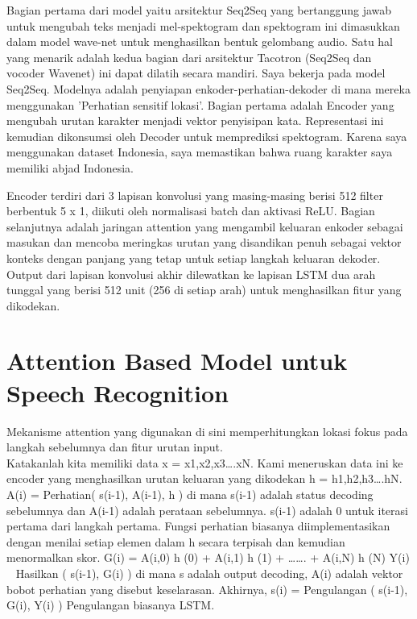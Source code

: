 Bagian pertama dari model yaitu arsitektur Seq2Seq yang bertanggung jawab untuk mengubah teks menjadi mel-spektogram dan spektogram ini dimasukkan dalam model wave-net untuk menghasilkan bentuk gelombang audio. Satu hal yang menarik adalah kedua bagian dari arsitektur Tacotron (Seq2Seq dan vocoder Wavenet) ini dapat dilatih secara mandiri. Saya bekerja pada model Seq2Seq.
Modelnya adalah penyiapan enkoder-perhatian-dekoder di mana mereka menggunakan 'Perhatian sensitif lokasi'. Bagian pertama adalah Encoder yang mengubah urutan karakter menjadi vektor penyisipan kata. Representasi ini kemudian dikonsumsi oleh Decoder untuk memprediksi spektogram. Karena saya menggunakan dataset Indonesia, saya memastikan bahwa ruang karakter saya memiliki abjad Indonesia.

Encoder terdiri dari 3 lapisan konvolusi yang masing-masing berisi 512 filter berbentuk 5 x 1, diikuti oleh normalisasi batch dan aktivasi ReLU. Bagian selanjutnya adalah jaringan attention yang mengambil keluaran enkoder sebagai masukan dan mencoba meringkas urutan yang disandikan penuh sebagai vektor konteks dengan panjang yang tetap untuk setiap langkah keluaran dekoder.
Output dari lapisan konvolusi akhir dilewatkan ke lapisan LSTM dua arah tunggal yang berisi 512 unit (256 di setiap arah) untuk menghasilkan fitur yang dikodekan\cite{9414001}.

\section{Attention Based Model untuk Speech Recognition}
Mekanisme attention yang digunakan di sini memperhitungkan lokasi fokus pada langkah sebelumnya dan fitur urutan input.\\
Katakanlah kita memiliki data x = {x1,x2,x3….xN}. Kami meneruskan data ini ke encoder yang menghasilkan urutan keluaran yang dikodekan h = {h1,h2,h3….hN}.
A(i) = Perhatian( s(i-1), A(i-1), h ) di mana s(i-1) adalah status decoding sebelumnya dan A(i-1) adalah perataan sebelumnya.
s(i-1) adalah 0 untuk iterasi pertama dari langkah pertama.
Fungsi perhatian biasanya diimplementasikan dengan menilai setiap elemen dalam h secara terpisah dan kemudian menormalkan skor.
G(i) = A(i,0) h (0) + A(i,1) h (1) + ……. + A(i,N) h (N)
Y(i) ~ Hasilkan ( s(i-1), G(i) )
di mana s adalah output decoding, A(i) adalah vektor bobot perhatian yang disebut keselarasan.
Akhirnya, s(i) = Pengulangan ( s(i-1), G(i), Y(i) )
Pengulangan biasanya LSTM.

